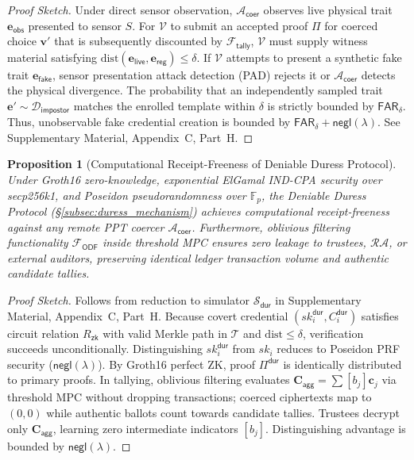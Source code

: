 \documentclass[10pt,letterpaper,journal]{IEEEtran}
\newtheorem{proposition}[theorem]{Proposition}
\begin{document}
\begin{proof}[Proof Sketch]
Under direct sensor observation, $\mathcal{A}_{\mathsf{coer}}$ observes live physical trait $\mathbf{e}_{\mathsf{obs}}$ presented to sensor $S$. For $\mathcal{V}$ to submit an accepted proof $\Pi$ for coerced choice $\mathbf{v}'$ that is subsequently discounted by $\mathcal{F}_{\mathsf{tally}}$, $\mathcal{V}$ must supply witness material satisfying $\mathrm{dist}(\mathbf{e}_{\mathsf{live}}, \mathbf{e}_{\mathsf{reg}}) \leq \delta$. If $\mathcal{V}$ attempts to present a synthetic fake trait $\mathbf{e}_{\mathsf{fake}}$, sensor presentation attack detection (PAD) rejects it or $\mathcal{A}_{\mathsf{coer}}$ detects the physical divergence. The probability that an independently sampled trait $\mathbf{e}' \sim \mathcal{D}_{\mathsf{impostor}}$ matches the enrolled template within $\delta$ is strictly bounded by $\mathsf{FAR}_\delta$. Thus, unobservable fake credential creation is bounded by $\mathsf{FAR}_\delta + \mathsf{negl}(\lambda)$. See Supplementary Material, Appendix~C, Part~H.
\end{proof}

\begin{proposition}[Computational Receipt-Freeness of Deniable Duress Protocol]
\label{prop:duress-receipt-freeness}
Under Groth16 zero-knowledge, exponential ElGamal IND-CPA security over secp256k1, and Poseidon pseudorandomness over $\mathbb{F}_p$, the Deniable Duress Protocol (\S\ref{subsec:duress_mechanism}) achieves computational receipt-freeness against any remote PPT coercer $\mathcal{A}_{\mathsf{coer}}$. Furthermore, oblivious filtering functionality $\mathcal{F}_{\mathsf{ODF}}$ inside threshold MPC ensures zero leakage to trustees, $\mathcal{RA}$, or external auditors, preserving identical ledger transaction volume and authentic candidate tallies.
\end{proposition}

\begin{proof}[Proof Sketch]
Follows from reduction to simulator $\mathcal{S}_{\mathsf{dur}}$ in Supplementary Material, Appendix~C, Part~H. Because covert credential $(sk_i^{\mathsf{dur}}, C_i^{\mathsf{dur}})$ satisfies circuit relation $R_{\mathsf{zk}}$ with valid Merkle path in $\mathcal{T}$ and $\mathrm{dist} \leq \delta$, verification succeeds unconditionally. Distinguishing $sk_i^{\mathsf{dur}}$ from $sk_i$ reduces to Poseidon PRF security ($\mathsf{negl}(\lambda)$). By Groth16 perfect ZK, proof $\Pi^{\mathsf{dur}}$ is identically distributed to primary proofs. In tallying, oblivious filtering evaluates $\mathbf{C}_{\mathsf{agg}} = \sum [b_j] \mathbf{c}_j$ via threshold MPC without dropping transactions; coerced ciphertexts map to $(0,0)$ while authentic ballots count towards candidate tallies. Trustees decrypt only $\mathbf{C}_{\mathsf{agg}}$, learning zero intermediate indicators $[b_j]$. Distinguishing advantage is bounded by $\mathsf{negl}(\lambda)$.
\end{proof}
\end{document}
